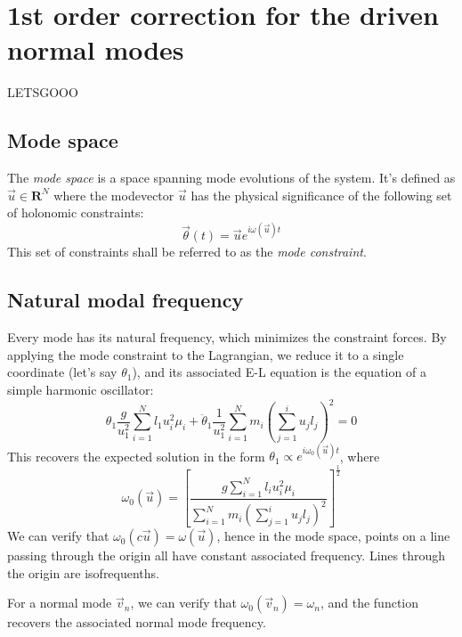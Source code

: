 \documentclass[12pt]{article}
\begin{document}
	\section{1st order correction for the driven normal modes}
	
	LETSGOOO
	
	\subsection{Mode space}
	The \textit{mode space} is a space spanning mode evolutions of the system. It's defined as $\vec{u}\in \mathbf{R}^N$ where the modevector $\vec{u}$ has the physical significance of the following set of holonomic constraints:
	$$\vec{\theta}(t)=\vec{u}e^{i\omega(\vec{u})t}$$
	This set of constraints shall be referred to as the \textit{mode constraint}.
	
	\subsection{Natural modal frequency}
	Every mode has its natural frequency, which minimizes the constraint forces. By applying the mode constraint to the Lagrangian, we reduce it to a single coordinate (let's say $\theta_1$), and its associated E-L equation is the equation of a simple harmonic oscillator:
	$$\theta_1 \frac{g}{u_1^2}\sum_{i=1}^N l_1 u_i^2 \mu_i + \ddot{\theta}_1 \frac{1}{u_1^2}\sum_{i=1}^N m_i\left(\sum_{j=1}^i u_j l_j\right)^2=0$$
	This recovers the expected solution in the form $\theta_1 \propto e^{i\omega_0(\vec{u})t}$, where
	$$\omega_0(\vec{u})=\left[\frac{g\sum\limits_{i=1}^N l_i u_i^2 \mu_i}{\sum\limits_{i=1}^N m_i\left(\sum\limits_{j=1}^i u_j l_j\right)^2}\right]^\frac{1}{2}$$
	We can verify that $\omega_0(c\vec{u})=\omega(\vec{u})$, hence in the mode space, points on a line passing through the origin all have constant associated frequency. Lines through the origin are isofrequenths.
	
	For a normal mode $\vec{v}_n$, we can verify that $\omega_0(\vec{v}_n)=\omega_n$, and the function recovers the associated normal mode frequency.
	
\end{document}
